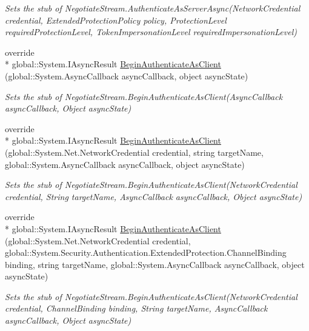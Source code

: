 \begin{DoxyCompactItemize}
\begin{DoxyCompactList}\small\item\em Sets the stub of Negotiate\-Stream.\-Authenticate\-As\-Server\-Async(\-Network\-Credential credential, Extended\-Protection\-Policy policy, Protection\-Level required\-Protection\-Level, Token\-Impersonation\-Level required\-Impersonation\-Level)\end{DoxyCompactList}\item 
override \\*
global\-::\-System.\-I\-Async\-Result \hyperlink{class_system_1_1_net_1_1_security_1_1_fakes_1_1_stub_negotiate_stream_ae36f67ec8bd8449e676030ec2934f541}{Begin\-Authenticate\-As\-Client} (global\-::\-System.\-Async\-Callback async\-Callback, object async\-State)
\begin{DoxyCompactList}\small\item\em Sets the stub of Negotiate\-Stream.\-Begin\-Authenticate\-As\-Client(\-Async\-Callback async\-Callback, Object async\-State)\end{DoxyCompactList}\item 
override \\*
global\-::\-System.\-I\-Async\-Result \hyperlink{class_system_1_1_net_1_1_security_1_1_fakes_1_1_stub_negotiate_stream_ae3a132900c14c8e0b0e77e0d232619ea}{Begin\-Authenticate\-As\-Client} (global\-::\-System.\-Net.\-Network\-Credential credential, string target\-Name, global\-::\-System.\-Async\-Callback async\-Callback, object async\-State)
\begin{DoxyCompactList}\small\item\em Sets the stub of Negotiate\-Stream.\-Begin\-Authenticate\-As\-Client(\-Network\-Credential credential, String target\-Name, Async\-Callback async\-Callback, Object async\-State)\end{DoxyCompactList}\item 
override \\*
global\-::\-System.\-I\-Async\-Result \hyperlink{class_system_1_1_net_1_1_security_1_1_fakes_1_1_stub_negotiate_stream_a06f952fc3dfd6ca05557f164435cbc02}{Begin\-Authenticate\-As\-Client} (global\-::\-System.\-Net.\-Network\-Credential credential, global\-::\-System.\-Security.\-Authentication.\-Extended\-Protection.\-Channel\-Binding binding, string target\-Name, global\-::\-System.\-Async\-Callback async\-Callback, object async\-State)
\begin{DoxyCompactList}\small\item\em Sets the stub of Negotiate\-Stream.\-Begin\-Authenticate\-As\-Client(\-Network\-Credential credential, Channel\-Binding binding, String target\-Name, Async\-Callback async\-Callback, Object async\-State)\end{DoxyCompactList}\item 

\end{DoxyCompactItemize}
